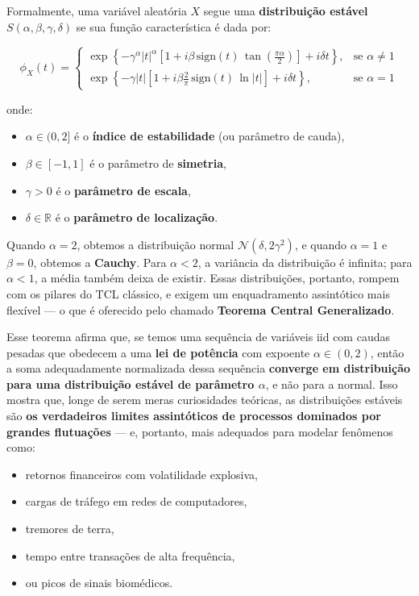 \documentclass[
  portuguese,
]{agujournal2019}
\providecommand{\tightlist}{%
  \setlength{\itemsep}{0pt}\setlength{\parskip}{0pt}}
\begin{document}
Formalmente, uma variável aleatória \(X\) segue uma \textbf{distribuição
estável} \(S(\alpha, \beta, \gamma, \delta)\) se sua função
característica é dada por:

\[
\phi_X(t) = 
\begin{cases}
\exp\left\{ -\gamma^\alpha |t|^\alpha \left[1 + i \beta \, \text{sign}(t) \, \tan\left(\frac{\pi \alpha}{2}\right)\right] + i\delta t \right\}, & \text{se } \alpha \neq 1 \\
\exp\left\{ -\gamma |t| \left[1 + i \beta \frac{2}{\pi} \, \text{sign}(t) \, \ln|t|\right] + i\delta t \right\}, & \text{se } \alpha = 1
\end{cases}
\]

onde:

\begin{itemize}
\tightlist
\item
  \(\alpha \in (0, 2]\) é o \textbf{índice de estabilidade} (ou
  parâmetro de cauda),
\item
  \(\beta \in [-1,1]\) é o parâmetro de \textbf{simetria},
\item
  \(\gamma > 0\) é o \textbf{parâmetro de escala},
\item
  \(\delta \in \mathbb{R}\) é o \textbf{parâmetro de localização}.
\end{itemize}

Quando \(\alpha = 2\), obtemos a distribuição normal
\(\mathcal{N}(\delta, 2\gamma^2)\), e quando \(\alpha = 1\) e
\(\beta = 0\), obtemos a \textbf{Cauchy}. Para \(\alpha < 2\), a
variância da distribuição é infinita; para \(\alpha < 1\), a média
também deixa de existir. Essas distribuições, portanto, rompem com os
pilares do TCL clássico, e exigem um enquadramento assintótico mais
flexível --- o que é oferecido pelo chamado \textbf{Teorema Central
Generalizado}.

Esse teorema afirma que, se temos uma sequência de variáveis iid com
caudas pesadas que obedecem a uma \textbf{lei de potência} com expoente
\(\alpha \in (0,2)\), então a soma adequadamente normalizada dessa
sequência \textbf{converge em distribuição para uma distribuição estável
de parâmetro \(\alpha\)}, e não para a normal. Isso mostra que, longe de
serem meras curiosidades teóricas, as distribuições estáveis são
\textbf{os verdadeiros limites assintóticos de processos dominados por
grandes flutuações} --- e, portanto, mais adequados para modelar
fenômenos como:

\begin{itemize}
\tightlist
\item
  retornos financeiros com volatilidade explosiva,
\item
  cargas de tráfego em redes de computadores,
\item
  tremores de terra,
\item
  tempo entre transações de alta frequência,
\item
  ou picos de sinais biomédicos.
\end{itemize}
\end{document}
